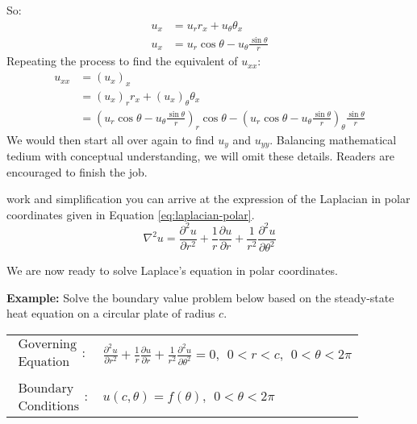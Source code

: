 So:
\begin{align*}
u_x &= u_r r_x + u_{\theta} \theta_x \\
u_x &= u_r \cos{\theta} - u_{\theta}\frac{\sin{\theta}}{r}
\end{align*}
Repeating the process to find the equivalent of $u_{xx}$:
\begin{align*}
u_{xx} &= \left(u_{x}\right)_{x} \\
&= \left(u_x\right)_r r_x + \left(u_x\right)_{\theta} \theta_x \\
&= \left(u_r \cos{\theta} - u_{\theta}\frac{\sin{\theta}}{r} \right)_r \cos{\theta} - \left( u_r \cos{\theta} - u_{\theta}\frac{\sin{\theta}}{r}\right)_{\theta}\frac{\sin{\theta}}{r}
\end{align*}
We would then start all over again to find $u_y$ and $u_{yy}$.  Balancing mathematical tedium with conceptual understanding, we will omit these details.  Readers are encouraged to finish the job.

 work and simplification you can arrive at the expression of the Laplacian in polar coordinates given in Equation \ref{eq:laplacian-polar}.
\begin{equation}
\nabla^2u = \frac{\partial^2 u}{\partial r^2} + \frac{1}{r}\frac{\partial u}{\partial r} + \frac{1}{r^2}\frac{\partial^2 u}{\partial \theta^2}
\label{eq:laplacian-polar}
\end{equation}

\vspace{0.1cm}

\noindent We are now ready to solve Laplace's equation in polar coordinates.

\vspace{0.25cm}

\noindent\textbf{Example:} Solve the boundary value problem below based on the steady-state heat equation on a circular plate of radius $c$.

\begin{table}[h]
\begin{tabular}{l l}
$\substack{\text{Governing} \\\text{Equation}}: $& $\frac{\partial^2 u}{\partial r^2} + \frac{1}{r}\frac{\partial u}{\partial r} + \frac{1}{r^2}\frac{\partial^2 u}{\partial \theta^2}= 0, \ \ 0<r<c, \ \ 0<\theta<2 \pi $\\
& \\
$\substack{\text{Boundary} \\ \text{Conditions}}: $ & $u(c,\theta) = f(\theta), \ \ 0 < \theta< 2 \pi$\\
\end{tabular}
\end{table} 

